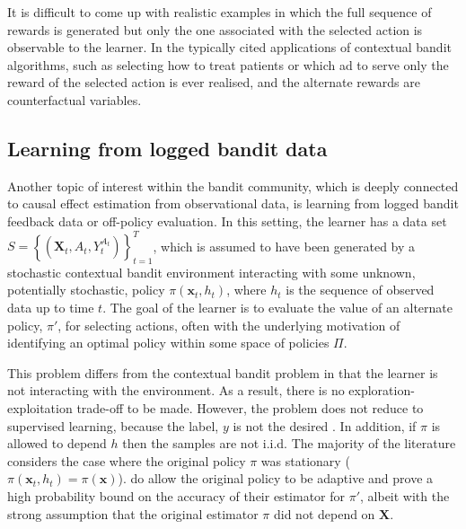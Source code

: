 \documentclass[11pt,a4paper,oneside]{book}
\newcommand{\set}[1]{\left\{#1\right\}}
\newcommand{\cfb}[2]{{#1}_t^{#2}} %
\renewcommand{\vec}[1]{\boldsymbol{#1}}
\theoremstyle{plain}
\theoremstyle{definition}
\begin{document}
It is difficult to come up with realistic examples in which the full sequence of rewards is generated but only the one associated with the selected action is observable to the learner. In the typically cited applications of contextual bandit algorithms, such as selecting how to treat patients or which ad to serve only the reward of the selected action is ever realised, and the alternate rewards are counterfactual variables.

\subsection{Learning from logged bandit data}
Another topic of interest within the bandit community, which is deeply connected to causal effect estimation from observational data, is learning from logged bandit feedback data or off-policy evaluation\citep{Langford2008a,strehl2010learning,Li2010,Dudik2011,Bottou2013,Swaminathan2015}. In this setting, the learner has a data set $S = \set{(\vec{X}_t,A_t,\cfb{Y}{A_t})}_{t=1}^T$, which is assumed to have been generated by a stochastic contextual bandit environment interacting with some unknown, potentially stochastic, policy $\pi(\vec{x}_t,h_t)$, where $h_t$ is the sequence of observed data up to time $t$. The goal of the learner is to evaluate the value of an alternate policy, $\pi'$, for selecting actions, often with the underlying motivation of identifying an optimal policy within some space of policies $\Pi$. 

This problem differs from the contextual bandit problem in that the learner is not interacting with the environment. As a result, there is no exploration-exploitation trade-off to be made. However, the problem does not reduce to supervised learning, because the label, $y$ is not the desired . In addition, if $\pi$ is allowed to depend $h$ then the samples are not i.i.d. The majority of the literature considers the case where the original policy $\pi$ was stationary ($\pi(\vec{x}_t,h_t) = \pi(\vec{x})$). \citet{Langford2008a} do allow the original policy to be adaptive and prove a high probability bound on the accuracy of their estimator for $\pi'$, albeit with the strong assumption that the original estimator $\pi$ did not depend on $\vec{X}$. 
\end{document}
